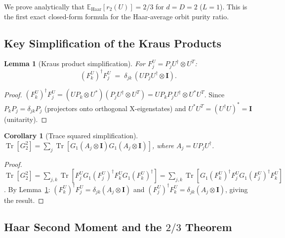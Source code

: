 \documentclass[12pt,a4paper]{article}
\newtheorem{lemma}[theorem]{Lemma}
\newtheorem{corollary}[theorem]{Corollary}
\begin{document}
We prove analytically that $\mathbb{E}_{\mathrm{Haar}}[r_2(U)]=2/3$ for $d=D=2$ ($L=1$).
This is the first exact closed-form formula for the Haar-average orbit purity ratio.

\subsection{Key Simplification of the Kraus Products}
\label{sec:kraus_simplify}

\begin{lemma}[Kraus product simplification]
\label{lem:kraus_product}
For $F_j^U = P_j U^\dagger\otimes U^T$:
\[
  (F_k^U)^\dagger F_j^U
  \;=\; \delta_{jk}\,(U P_j U^\dagger\otimes\mathbf{I}).
\]
\end{lemma}

\begin{proof}
$(F_k^U)^\dagger F_j^U = (UP_k\otimes U^*)(P_j U^\dagger\otimes U^T)
= UP_k P_j U^\dagger\otimes U^* U^T$.
Since $P_k P_j = \delta_{jk}P_j$ (projectors onto orthogonal X-eigenstates)
and $U^* U^T = (U^\dagger U)^* = \mathbf{I}$ (unitarity).
\end{proof}

\begin{corollary}[Trace squared simplification]
\label{cor:trace_sq}
$\operatorname{Tr}[G_2^2] = \sum_j\operatorname{Tr}[G_1(A_j\otimes\mathbf{I})G_1(A_j\otimes\mathbf{I})]$,
where $A_j = U P_j U^\dagger$.
\end{corollary}

\begin{proof}
$\operatorname{Tr}[G_2^2] = \sum_{j,k}\operatorname{Tr}[F_j^U G_1(F_j^U)^\dagger F_k^U G_1(F_k^U)^\dagger]
= \sum_{j,k}\operatorname{Tr}[G_1(F_k^U)^\dagger F_j^U G_1(F_j^U)^\dagger F_k^U]$.
By Lemma~\ref{lem:kraus_product}: $(F_k^U)^\dagger F_j^U = \delta_{jk}(A_j\otimes\mathbf{I})$
and $(F_j^U)^\dagger F_k^U = \delta_{jk}(A_j\otimes\mathbf{I})$, giving the result.
\end{proof}

\subsection{Haar Second Moment and the $2/3$ Theorem}
\label{sec:haar_2/3}
\end{document}
